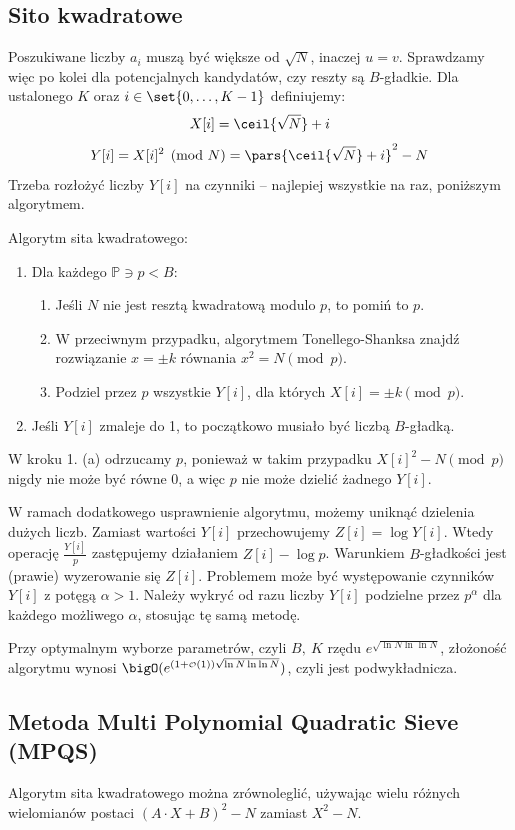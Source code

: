 \subsection{Sito kwadratowe}
Poszukiwane liczby \( a_i \) muszą być większe od \( \sqrt{N} \), inaczej \( u = v \). Sprawdzamy więc po kolei dla potencjalnych kandydatów, czy reszty są \( B \)-gładkie.
Dla ustalonego \( K \) oraz \( i \in \set{0, \dots, K-1} \) definiujemy:
\[ X[i] = \ceil{\sqrt{N}} + i \]
\[ Y[i] = X[i]^2 \pmod{N} = \pars{\ceil{\sqrt{N}} + i}^2 - N \]
Trzeba rozłożyć liczby \( Y[i] \) na czynniki -- najlepiej wszystkie na raz, poniższym algorytmem.
\begin{greyframe}
	Algorytm sita kwadratowego:
	\begin{enumerate}
		\item Dla każdego \( \mathbb{P} \ni p < B \):
		      \begin{enumerate}
			      \item Jeśli \( N \) nie jest resztą kwadratową modulo \( p \), to pomiń to \(p\).
			      \item W przeciwnym przypadku, algorytmem Tonellego-Shanksa znajdź rozwiązanie \( x = \pm k \) równania \( x^2 = N \pmod{p} \).
			      \item Podziel przez \( p \) wszystkie \( Y[i] \), dla których \( X[i] = \pm k \pmod{p} \).
		      \end{enumerate}
		\item Jeśli \( Y[i] \) zmaleje do 1, to początkowo musiało być liczbą \( B \)-gładką.
	\end{enumerate}
\end{greyframe}
W kroku 1. (a) odrzucamy \(p\), ponieważ w takim przypadku \(X[i]^2 - N \pmod{p}\) nigdy nie może być równe 0, a więc \(p\) nie może dzielić żadnego \(Y[i]\).

W ramach dodatkowego usprawnienie algorytmu, możemy uniknąć dzielenia dużych liczb. Zamiast wartości \( Y[i] \) przechowujemy \( Z[i] = \log Y[i] \).
Wtedy operację \( \frac{Y[i]}{p} \) zastępujemy działaniem \( Z[i] - \log p \). Warunkiem \( B \)-gładkości jest (prawie) wyzerowanie się \( Z[i] \).
Problemem może być występowanie czynników \( Y[i] \) z potęgą \( \alpha > 1 \). Należy wykryć od razu liczby \( Y[i] \) podzielne przez \( p^{\alpha} \) dla każdego możliwego \( \alpha \), stosując tę samą metodę.

Przy optymalnym wyborze parametrów, czyli \( B, \ K \) rzędu \( e^{\sqrt{\ln N \ln\ln N}} \), złożoność algorytmu wynosi \( \bigO(e^{(1 + {\scriptscriptstyle\mathcal{O}}(1))\sqrt{\ln N \ln\ln N}}) \), czyli jest podwykładnicza.

\subsection{Metoda Multi Polynomial Quadratic Sieve (MPQS)}
Algorytm sita kwadratowego można zrównoleglić, używając wielu różnych wielomianów postaci \( (A \cdot X + B)^2 - N \) zamiast \( X^2 - N \).
